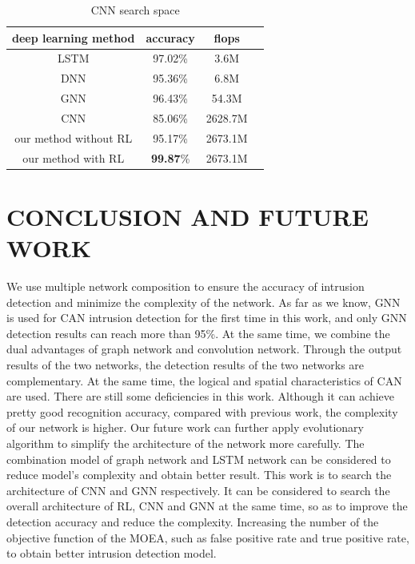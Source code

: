 \documentclass[lettersize,journal]{IEEEtran}
\begin{document}
\begin{table}[!t]
\caption{CNN search space\label{table5}}
\centering
\begin{tabular}{cccc}
\hline
deep learning method & accuracy & flops\\
\hline
LSTM\cite{49} & 97.02\% & 3.6M\\
DNN\cite{75} & 95.36\% & 6.8M\\
GNN & 96.43\% & 54.3M\\
CNN\cite{48} & 85.06\% & 2628.7M\\
our method without RL & 95.17\% & 2673.1M\\
our method with RL & \textbf{99.87}\% & 2673.1M\\
\hline
\end{tabular}
\end{table}

\section{CONCLUSION AND FUTURE WORK}\label{section_conclusion}
We use multiple network composition to ensure the accuracy of intrusion detection and minimize the complexity of the network. As far as we know, GNN is used for CAN intrusion detection for the first time in this work, and only GNN detection results can reach more than 95\%. At the same time, we combine the dual advantages of graph network and convolution network. Through the output results of the two networks, the detection results of the two networks are complementary. At the same time, the logical and spatial characteristics of CAN are used. There are still some deficiencies in this work. Although it can achieve pretty good recognition accuracy, compared with previous work, the complexity of our network is higher. Our future work can further apply evolutionary algorithm to simplify the architecture of the network more carefully. The combination model of graph network and LSTM network can be considered to reduce model’s complexity and obtain better result. This work is to search the architecture of CNN and GNN respectively. It can be considered to search the overall architecture of RL, CNN and GNN at the same time, so as to improve the detection accuracy and reduce the complexity. Increasing the number of the objective function of the MOEA, such as false positive rate and true positive rate, to obtain better intrusion detection model.

\end{document}
